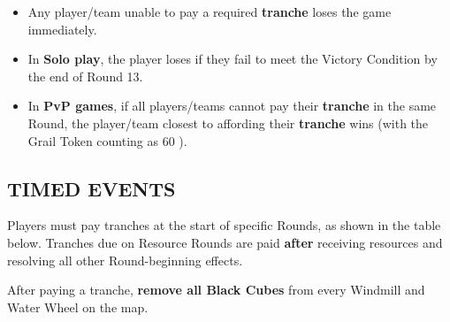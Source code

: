 \begin{multicols}{2}
\begin{itemize}
  \item Any player/team unable to pay a required \textbf{tranche} loses the game immediately.
  \item In \textbf{Solo play}, the player loses if they fail to meet the Victory Condition by the end of Round 13.
  \item In \textbf{PvP games}, if all players/teams cannot pay their \textbf{tranche} in the same Round, the player/team closest to affording their \textbf{tranche} wins (with the Grail Token counting as 60 ).
\end{itemize}

\vfill

\subsection*{\MakeUppercase{Timed Events}}

Players must pay tranches at the start of specific Rounds, as shown in the table below. Tranches due on Resource Rounds are paid \textbf{after} receiving resources and resolving all other Round-beginning effects.

After paying a tranche, \textbf{remove all Black Cubes} from every Windmill and Water Wheel on the map.


\end{multicols}

